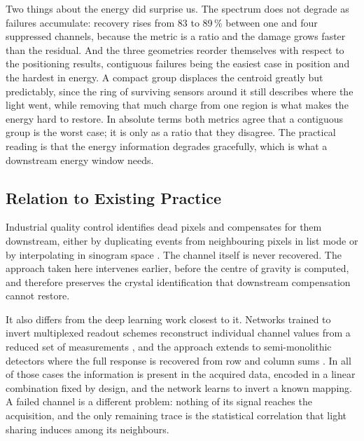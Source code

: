 \documentclass[10pt,conference]{IEEEtran}
\begin{document}
Two things about the energy did surprise us. The spectrum does not degrade as
failures accumulate: recovery rises from 83 to 89\,\% between one and four
suppressed channels, because the metric is a ratio and the damage grows faster
than the residual. And the three geometries reorder themselves with respect to
the positioning results, contiguous failures being the easiest case in position
and the hardest in energy. A compact group displaces the centroid greatly but
predictably, since the ring of surviving sensors around it still describes
where the light went, while removing that much charge from one region is what
makes the energy hard to restore. In absolute terms both metrics agree that a
contiguous group is the worst case; it is only as a ratio that they disagree.
The practical reading is that the energy information degrades gracefully, which
is what a downstream energy window needs.

\subsection{Relation to Existing Practice}

Industrial quality control identifies dead pixels and compensates for them
downstream, either by duplicating events from neighbouring pixels in list mode
or by interpolating in sinogram space \cite{philips2015deadpixel}. The channel
itself is never recovered. The approach taken here intervenes earlier, before
the centre of gravity is computed, and therefore preserves the crystal
identification that downstream compensation cannot restore.

It also differs from the deep learning work closest to it. Networks trained to
invert multiplexed readout schemes reconstruct individual channel values from a
reduced set of measurements \cite{li2023, niu_cnn-based_2024}, and the approach
extends to semi-monolithic detectors where the full response is recovered from
row and column sums \cite{loignon-houle_multi-input_2026}. In all of those
cases the information is present in the acquired data, encoded in a linear
combination fixed by design, and the network learns to invert a known mapping.
A failed channel is a different problem: nothing of its signal reaches the
acquisition, and the only remaining trace is the statistical correlation that
light sharing induces among its neighbours.
\end{document}
